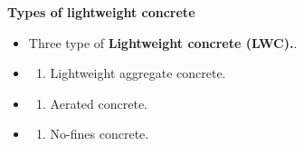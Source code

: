 \documentclass[aspectratio=169]{beamer}
\begin{document}
\begin{frame}{\textbf{Types of lightweight concrete}}
    \begin{itemize}
  \large\item[$\bullet$]<1->Three type of \textbf{{Lightweight concrete (LWC).}}.
 \item[$\empty$]<2->\begin{enumerate}
              \item Lightweight aggregate concrete.
          \end{enumerate}
          \item[$\empty$]<3->\begin{enumerate}
           \item[2.] Aerated concrete.
           \end{enumerate}
           \item[$\empty$]<4->\begin{enumerate}
           \item[3.] No-fines concrete.
               \end{enumerate}
               \vspace{0.5cm}
               \end{itemize}
  \end{frame}
\end{document}
